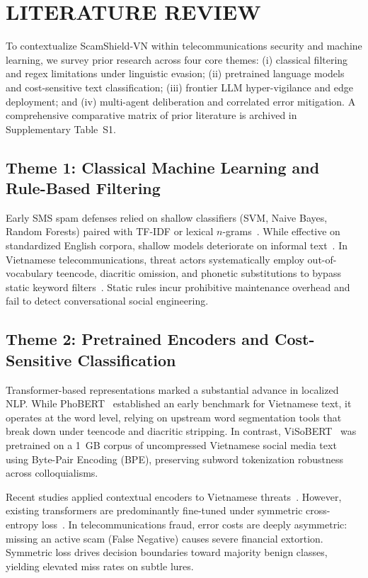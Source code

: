 \section{LITERATURE REVIEW}
\label{sec:literature}

To contextualize ScamShield-VN within telecommunications security and machine learning, we survey prior research across four core themes: (i) classical filtering and regex limitations under linguistic evasion; (ii) pretrained language models and cost-sensitive text classification; (iii) frontier LLM hyper-vigilance and edge deployment; and (iv) multi-agent deliberation and correlated error mitigation. A comprehensive comparative matrix of prior literature is archived in Supplementary Table~S1.

\subsection{Theme 1: Classical Machine Learning and Rule-Based Filtering}
Early SMS spam defenses relied on shallow classifiers (SVM, Naive Bayes, Random Forests) paired with TF-IDF or lexical $n$-grams~\cite{saeed2023method, xie2025comparing, ghourabi2023enhancing}. While effective on standardized English corpora, shallow models deteriorate on informal text~\cite{xie2025comparing}. In Vietnamese telecommunications, threat actors systematically employ out-of-vocabulary teencode, diacritic omission, and phonetic substitutions to bypass static keyword filters~\cite{seo2024ondevice}. Static rules incur prohibitive maintenance overhead and fail to detect conversational social engineering.

\subsection{Theme 2: Pretrained Encoders and Cost-Sensitive Classification}
Transformer-based representations marked a substantial advance in localized NLP. While PhoBERT~\cite{nguyen2020phobert} established an early benchmark for Vietnamese text, it operates at the word level, relying on upstream word segmentation tools that break down under teencode and diacritic stripping. In contrast, ViSoBERT~\cite{nguyen2023visobert} was pretrained on a 1~GB corpus of uncompressed Vietnamese social media text using Byte-Pair Encoding (BPE), preserving subword tokenization robustness across colloquialisms.

Recent studies applied contextual encoders to Vietnamese threats~\cite{tuan2023evaluating, cam2026vnsed, nguyenxuan2026mixed}. However, existing transformers are predominantly fine-tuned under symmetric cross-entropy loss~\cite{elkan2001foundations}. In telecommunications fraud, error costs are deeply asymmetric: missing an active scam (False Negative) causes severe financial extortion. Symmetric loss drives decision boundaries toward majority benign classes, yielding elevated miss rates on subtle lures.

